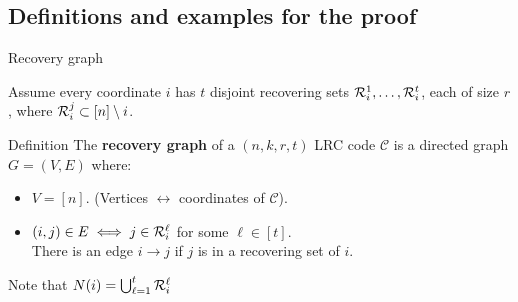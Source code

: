 \subsection{Definitions and examples for the proof}
\begin{frame}{Recovery graph}

        Assume every coordinate $i$ has $t$ disjoint recovering sets $\mathcal{R}_i^1, \dots, \mathcal{R}_i^t$, each of size $r$, where $\mathcal{R}_i^j \subset \left[n \right] \setminus i$. \pause
        \begin{block}{Definition}
            The \textbf{recovery graph} of a $(n,k,r,t)$ LRC code $\mathcal{C}$ is a directed graph $G=(V,E)$ where: \pause
            \begin{itemize}
                \item $V = \left[n \right]$. (Vertices $\leftrightarrow$ coordinates of $\mathcal{C}$). \pause
                \item $(i,j) \in E \iff j \in \mathcal{R}_i^\ell$ for some $\ell \in \left[ t \right]$.\\ \pause
                There is an edge $i \rightarrow j$ if $j$ is in a recovering set of $i$.\\ \pause
            \end{itemize}    
                Note that $N(i) = \bigcup_{\ell = 1}^{t} \mathcal{R}_i^\ell$
        \end{block}
    \end{frame}    
       
